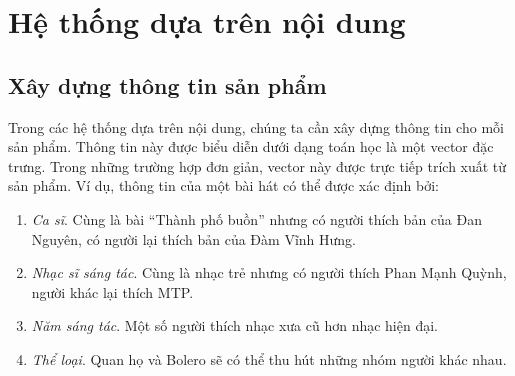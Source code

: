  
\section{Hệ thống dựa trên nội dung}
 
 
\subsection{Xây dựng thông tin sản phẩm}
 
Trong các hệ thống dựa trên nội dung, chúng ta cần xây dựng thông tin cho mỗi sản phẩm. Thông tin này được biểu diễn
dưới dạng toán học là một vector đặc trưng. Trong những trường hợp đơn giản,
vector này được trực tiếp trích xuất từ sản phẩm. Ví dụ, thông tin của một bài hát có thể được xác định bởi:
\begin{enumerate}
    \item \textit{Ca sĩ}. Cùng là bài ``{Thành phố buồn}'' nhưng có người thích bản của Đan Nguyên, có người lại thích bản của Đàm Vĩnh Hưng.  
    \item \textit{Nhạc sĩ sáng tác}. Cùng là nhạc trẻ nhưng có người thích Phan Mạnh Quỳnh, người khác lại thích MTP.  
    \item \textit{Năm sáng tác}. Một số người thích nhạc xưa cũ hơn nhạc hiện đại.  
    \item \textit{Thể loại}. Quan họ và Bolero sẽ có thể thu hút những nhóm người khác nhau.  
\end{enumerate}
 
